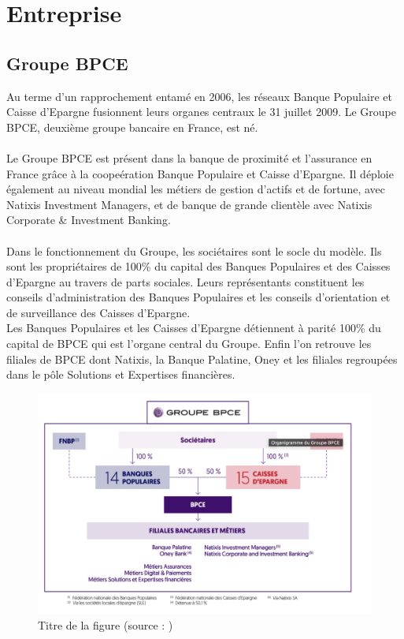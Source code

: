 \section*{Entreprise}

\subsection*{Groupe BPCE}
Au terme d’un rapprochement entamé en 2006, les réseaux Banque Populaire et Caisse d’Epargne fusionnent leurs organes centraux le 31 juillet 2009. Le Groupe BPCE, deuxième groupe bancaire en France, est né.
\\
\\
Le Groupe BPCE est présent dans la banque de proximité et l’assurance en France grâce à la coopeération Banque Populaire et Caisse d’Epargne. Il déploie également au niveau mondial les métiers de gestion d’actifs et de fortune, avec Natixis Investment Managers, et de banque de grande clientèle avec Natixis Corporate \& Investment Banking.
\\
\\
Dans le fonctionnement du Groupe, les sociétaires sont le socle du modèle. Ils sont les propriétaires de 100\% du capital des Banques Populaires et des Caisses d’Epargne au travers de parts sociales. Leurs représentants constituent les conseils d’administration des Banques Populaires et les conseils d’orientation et de surveillance des Caisses d’Epargne.
\\
Les Banques Populaires et les Caisses d’Epargne détiennent à parité 100\% du capital de BPCE qui est l'organe central du Groupe. Enfin l'on retrouve les filiales de BPCE dont Natixis, la Banque Palatine, Oney et les filiales regroupées dans le pôle Solutions et Expertises financières.        


\begin{figure}[h!]
  \caption{Titre de la figure (source : \cite{ahu61})}
  \includegraphics[width=\linewidth]{./img/intro/bpce_orga}
\end{figure}


